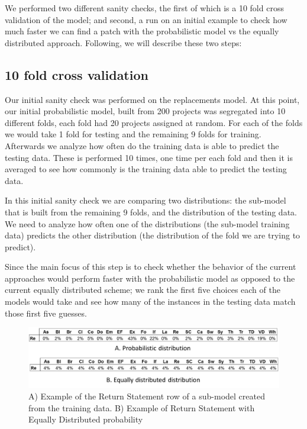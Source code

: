 \documentclass[conference]{IEEEtran}
\begin{document}
We performed two different sanity checks, the first of which is a 10 fold cross 
validation of the model; and second, a run on an initial example to check how 
much faster we can find a patch with the probabilistic model vs the equally 
distributed approach. Following, we will describe these two steps:

\subsection{10 fold cross validation}

Our initial sanity check was performed on the replacements model. At this point, 
our initial probabilistic model, built from 200 projects was segregated into 10 
different folds, each fold had 20 projects assigned at random. For each of the 
folds we would take 1 fold for testing and the remaining 9 folds for training. 
Afterwards we analyze how often do the training data is able to predict the 
testing data. These is performed 10 times, one time per each fold and then it is 
averaged to see how commonly is the training data able to predict the testing 
data.

In this initial sanity check we are comparing two distributions: the sub-model 
that is built from the remaining 9 folds, and the distribution of the testing 
data. We need to analyze how often one of the distributions (the sub-model 
training data) predicts the other distribution (the distribution of the fold we 
are trying to predict). 

Since the main focus of this step is to check whether the behavior of the 
current approaches would perform faster with the probabilistic model as opposed 
to the current equally distributed scheme; we rank the first five choices each 
of the models would take and see how many of the instances in the testing data 
match those first five guesses.

\begin{figure}[!h]
  \centering
    \includegraphics[scale=0.25]{sanity5}
  \caption{A) Example of the Return Statement row of a sub-model created from 
the 
training data. B) Example of Return Statement with Equally Distributed 
probability}
  \label{fig:exPredReturn}
\end{figure}
\end{document}
